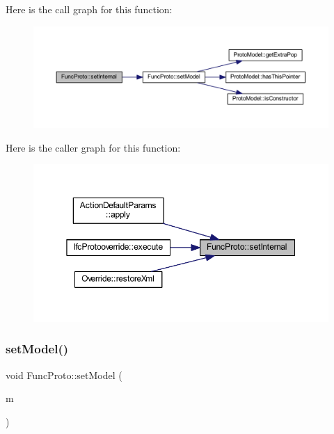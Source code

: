 Here is the call graph for this function\+:
\nopagebreak
\begin{figure}[H]
\begin{center}
\leavevmode
\includegraphics[width=350pt]{class_func_proto_af69f89b0b3c5165e521d33b658599699_cgraph}
\end{center}
\end{figure}
Here is the caller graph for this function\+:
\nopagebreak
\begin{figure}[H]
\begin{center}
\leavevmode
\includegraphics[width=350pt]{class_func_proto_af69f89b0b3c5165e521d33b658599699_icgraph}
\end{center}
\end{figure}
\mbox{\label{class_func_proto_ae8c14d15c7296c47deae3433687b1b15}} 
\subsubsection{\texorpdfstring{setModel()}{setModel()}}
{\footnotesize\ttfamily void Func\+Proto\+::set\+Model (\begin{DoxyParamCaption}\item[{\mbox{\hyperlink{class_proto_model}{Proto\+Model}} $\ast$}]{m }\end{DoxyParamCaption})}




